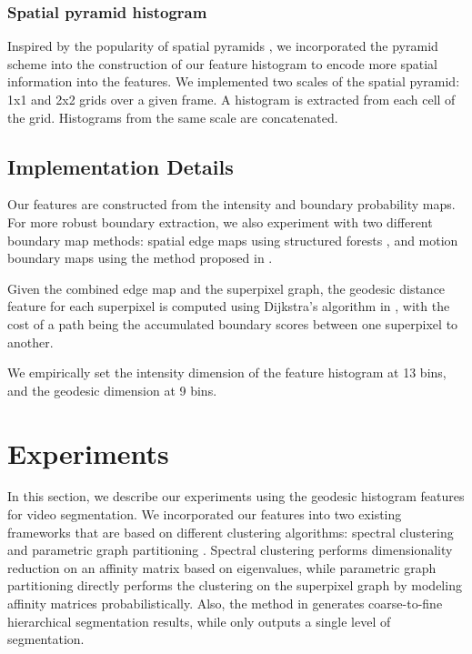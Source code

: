 \documentclass[runningheads]{llncs}
\begin{document}
\subsubsection{Spatial pyramid histogram}
Inspired by the popularity of spatial pyramids \cite{1641019}, we incorporated the pyramid scheme into the construction of our feature histogram to encode more spatial information into the features. We implemented two scales of the spatial pyramid: 1x1 and 2x2 grids over a given frame. A histogram is extracted from each cell of the grid. Histograms from the same scale are concatenated.






\subsection{Implementation Details }
\label{sec:ID}
Our features are constructed from the intensity and boundary probability maps. For more robust boundary extraction, we also  experiment with two different boundary map methods: spatial edge maps using structured forests \cite{export:202540}, and motion boundary maps using the method proposed in \cite{Weinzaepfel_2015_CVPR}.  

Given the combined edge map and the superpixel graph, the geodesic distance feature for each superpixel is computed using Dijkstra's algorithm in , with the cost of a path being the accumulated boundary scores between one superpixel to another. 

We empirically set the intensity dimension of the feature histogram at 13 bins, and the geodesic dimension at 9 bins. 

\section{ Experiments}
\label{sec:exp}
In this section, we describe our experiments using the geodesic histogram features for video segmentation. We incorporated our features into two existing frameworks that are based on different clustering algorithms: spectral clustering \cite{Galasso2013} and parametric graph partitioning \cite{Yu_2015_ICCV}. Spectral clustering performs dimensionality reduction on an affinity matrix based on eigenvalues, while parametric graph partitioning directly performs the clustering on the superpixel graph by modeling  affinity matrices probabilistically. Also, the method in \cite{Galasso2013} generates coarse-to-fine hierarchical segmentation results, while \cite{Yu_2015_ICCV} only outputs a single level of segmentation. 
\end{document}

